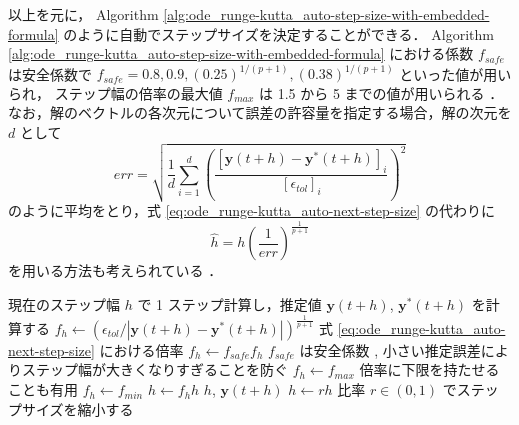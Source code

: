 以上を元に，
Algorithm \ref{alg:ode_runge-kutta_auto-step-size-with-embedded-formula}
のように自動でステップサイズを決定することができる．
Algorithm \ref{alg:ode_runge-kutta_auto-step-size-with-embedded-formula}
における係数 $f_{safe}$ は安全係数で
$f_{safe} = 0.8, 0.9, (0.25)^{1/(p+1)}, (0.38)^{1/(p+1)}$
といった値が用いられ，
ステップ幅の倍率の最大値 $f_{max}$ は
1.5 から 5 までの値が用いられる
\cite[Section II.4]{Hairer1993}．
なお，解のベクトルの各次元について誤差の許容量を指定する場合，解の次元を $d$ として
\begin{equation}
    err = \sqrt{\frac{1}{d} \sum_{i=1}^d \left(\frac{[\bm{y}(t + h) - \bm{y}^*(t + h)]_i}{[\epsilon_{tol}]_i} \right)^2}
    \label{eq:ode_runge-kutta_auto-next-step-size-multi-dimension-error}
\end{equation}
のように平均をとり，式 \eqref{eq:ode_runge-kutta_auto-next-step-size} の代わりに
\begin{equation}
    \hat{h} = h
    \left(\frac{1}{err}\right)^{\frac{1}{p+1}}
    \label{eq:ode_runge-kutta_auto-next-step-size-multi-dimension}
\end{equation}
を用いる方法も考えられている
\cite[Section II.4]{Hairer1993}．

\begin{algorithm}[tp]
    \caption{式 \eqref{eq:ode_runge-kutta_auto-next-step-size} を利用したステップサイズの自動決定 %
        \cite[4.1 節 (a)]{Mitsui1993}, \cite[Section II.4]{Hairer1993}}
    \label{alg:ode_runge-kutta_auto-step-size-with-embedded-formula}
    \begin{algorithmic}[1]
        \Loop
        \State 現在のステップ幅 $h$ で 1 ステップ計算し，推定値 $\bm{y}(t + h)$, $\bm{y}^*(t+h)$ を計算する
        \State $f_{h} \gets \left(\epsilon_{tol} / \left| \bm{y}(t + h) - \bm{y}^*(t + h) \right|\right)^{\frac{1}{p+1}}$
        \Comment 式 \eqref{eq:ode_runge-kutta_auto-next-step-size} における倍率
        \State $f_h \gets f_{safe} f_h$
        \Comment $f_{safe}$ は安全係数 \cite[4.1 節 (a)]{Mitsui1993}, \cite[Section II.4]{Hairer1993}
        \Comment 小さい推定誤差によりステップ幅が大きくなりすぎることを防ぐ \cite[Section II.4]{Hairer1993}
        \State $f_h \gets f_{max}$
        \EndIf
        \Comment 倍率に下限を持たせることも有用 \cite[Section II.4]{Hairer1993}
        \State $f_h \gets f_{min}$
        \EndIf
        \State $h \gets f_h h$
        \State \Return $h$, $\bm{y}(t + h)$
        \EndIf
        \State $h \gets r h$ \Comment 比率 $r \in (0, 1)$ でステップサイズを縮小する
        \EndLoop
        \EndProcedure
    \end{algorithmic}
\end{algorithm}

